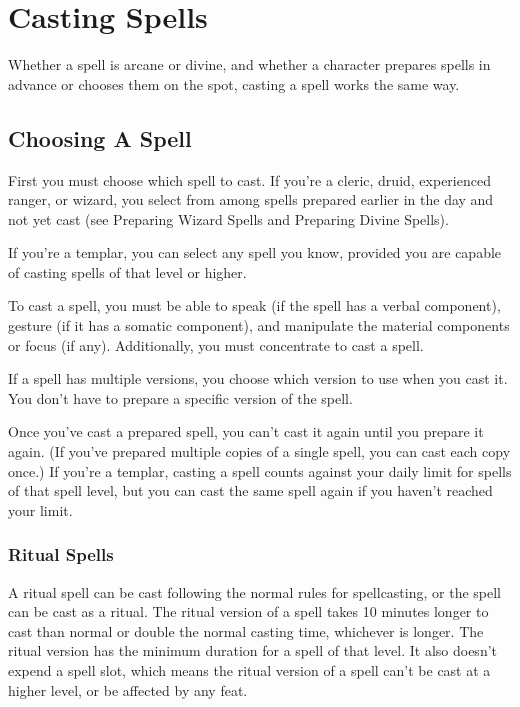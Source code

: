 \section{Casting Spells}
Whether a spell is arcane or divine, and whether a character prepares spells in advance or chooses them on the spot, casting a spell works the same way.

\subsection{Choosing A Spell}
First you must choose which spell to cast. If you're a cleric, druid, experienced ranger, or wizard, you select from among spells prepared earlier in the day and not yet cast (see Preparing Wizard Spells and Preparing Divine Spells).

If you're a templar, you can select any spell you know, provided you are capable of casting spells of that level or higher.

To cast a spell, you must be able to speak (if the spell has a verbal component), gesture (if it has a somatic component), and manipulate the material components or focus (if any). Additionally, you must concentrate to cast a spell.

If a spell has multiple versions, you choose which version to use when you cast it. You don't have to prepare a specific version of the spell.

Once you've cast a prepared spell, you can't cast it again until you prepare it again. (If you've prepared multiple copies of a single spell, you can cast each copy once.) If you're a templar, casting a spell counts against your daily limit for spells of that spell level, but you can cast the same spell again if you haven't reached your limit.

\subsubsection{Ritual Spells}
A ritual spell can be cast following the normal rules for spellcasting, or the spell can be cast as a ritual. The ritual version of a spell takes 10 minutes longer to cast than normal or double the normal casting time, whichever is longer. The ritual version has the minimum duration for a spell of that level. It also doesn't expend a spell slot, which means the ritual version of a spell can't be cast at a higher level, or be affected by any feat.


